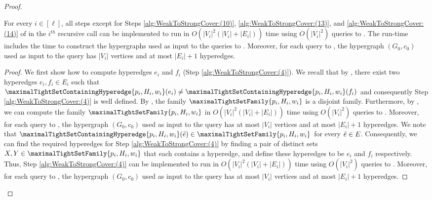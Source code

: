 \begin{proof}
\begin{claim}\label{claim:weak-to-strong-runtime-of-one-recursive-call}
For every $i\in [\ell]$, all steps except for Steps \ref{alg:WeakToStrongCover:(10)},  \ref{alg:WeakToStrongCover:(13)}, and  \ref{alg:WeakToStrongCover:(14)} of  in the $i^{th}$ recursive call can be implemented to run in 
$O(|V_i|^2(|V_i| + |E_i|))$ time
using 
$O(|V_i|^2)$ queries to . The run-time includes the time to construct the hypergraphs used as input to the queries to . Moreover, for each query to , the hypergraph $(G_0, c_0)$ used as input to the query has  $|V_i|$ vertices and at most $|E_i| + 1$ hyperedges.
\end{claim}
\begin{proof}
We first show how to compute hyperedges $e_i$ and $f_i$ (Step \ref{alg:WeakToStrongCover:(4)}). We recall that by , there exist two hyperedges $e_i, f_i \in E_i$ such that $\maximalTightSetContainingHyperedge{p_i, H_i, w_i}(e_i) \not = \maximalTightSetContainingHyperedge{p_i, H_i, w_i}(f_i)$ and consequently Step \ref{alg:WeakToStrongCover:(4)} is well defined. By , the family $\maximalTightSetFamily{p_i, H_i, w_i}$ is a disjoint family. 
Furthermore,  by , we can compute the family $\maximalTightSetFamily{p_i, H_i, w_i}$ in $O(|V_i|^2(|V_i|+|E_i|))$ time using $O(|V_i|^2)$ queries to . 
Moreover, for each query to , the hypergraph $(G_0, c_0)$ used as input to the query has at most $|V_i|$ vertices and at most $|E_i|+1$ hyperedges. 
We note that $\maximalTightSetContainingHyperedge{p_i, H_i, w_i}(\Tilde{e}) \in \maximalTightSetFamily{p_i, H_i, w_i}$ for every $\Tilde{e} \in E$.
Consequently, we can find the required hyperedges for Step \ref{alg:WeakToStrongCover:(4)} by finding a pair of distinct sets $X, Y \in \maximalTightSetFamily{p_i, H_i, w_i}$ that each contains a hyperedge, and define these hyperedges to be $e_i$ and $f_i$ respectively. Thus, Step  \ref{alg:WeakToStrongCover:(4)} can be implemented to run in $O(|V_i|^2(|V_i|+|E_i|))$ time using $O(|V_i|^2)$ queries to . Moreover, for each query to , the hypergraph $(G_0, c_0)$ used as input to the query has at most $|V_i|$ vertices and at most $|E_i|+1$ hyperedges. 


\end{proof}
\end{proof}
